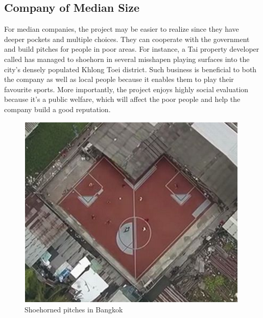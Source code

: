 \documentclass[12pt]{article}
\begin{document}
\subsection{Company of Median Size}
For median companies, the project may be easier to realize since they have deeper pockets and multiple choices. They can cooperate with the government and build pitches for people in poor areas. For instance, a Tai property developer called has managed to shoehorn in several misshapen playing surfaces into the city's densely populated Khlong Toei district. Such business is beneficial to both the company as well as local people because it enables them to play their favourite sports. More importantly, the project enjoys highly social evaluation because it's a public welfare, which will affect the poor people and help the company build a good reputation. 
\begin{figure}[H]
\centering
\includegraphics[scale = 0.6]{P2.jpg}
\caption{Shoehorned pitches in Bangkok}
\end{figure} 
\end{document}

